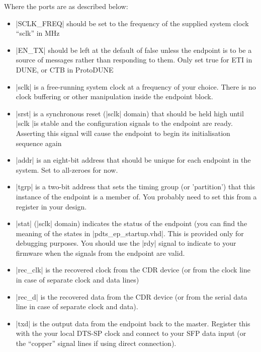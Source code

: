 \documentclass{dune}
\begin{document}
Where the ports are as described below:

\begin{itemize}
    

\item |SCLK_FREQ| should be set to the frequency of the supplied system clock ``sclk'' in MHz

\item |EN_TX| should be left at the default of false unless the endpoint is to be a source of messages rather than responding to them. Only set true for ETI in DUNE, or CTB in ProtoDUNE

\item |sclk| is a free-running system clock at a frequency of your choice. There is no clock
buffering or other manipulation inside the endpoint block.

\item |srst| is a synchronous reset (|sclk| domain) that should be held high until |sclk |is stable
and the configuration signals to the endpoint are ready. Asserting this signal will cause
the endpoint to begin its initialisation sequence again

\item |addr| is an eight-bit address that should be unique for each endpoint in the system.
Set to all-zeroes for now.

\item |tgrp| is a two-bit address that sets the timing group (or 'partition') that this instance
of the endpoint is a member of. You probably need to set this from a register in your
design.

\item |stat| (|sclk| domain) indicates the status of the endpoint (you can find the meaning of the states
in |pdts_ep_startup.vhd|. This is provided only for debugging purposes. You should use the
|rdy| signal to indicate to your firmware when the signals from the endpoint are valid.

\item |rec_clk| is the recovered clock from the CDR device (or from the clock line in case of separate clock and data lines)

\item |rec_d| is the recovered data from the CDR device (or from the serial data line in case of separate clock and data).

\item |txd| is the output data from the endpoint back to the master. Register this with the your local DTS-SP clock and connect to your
SFP data input (or the ``copper'' signal lines if using direct connection).


\end{itemize}
\end{document}

